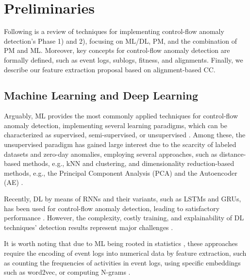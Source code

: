 \section{Preliminaries}
\label{sec:background}

Following is a review of techniques for implementing control-flow anomaly detection's Phase 1) and 2), focusing on ML/DL, PM, and the combination of PM and ML. Moreover, key concepts for control-flow anomaly detection are formally defined, such as event logs, sublogs, fitness, and alignments. Finally, we describe our feature extraction proposal based on alignment-based CC.

\subsection{Machine Learning and Deep Learning}
Arguably, ML provides the most commonly applied techniques for control-flow anomaly detection, implementing several learning paradigms, which can be characterized as supervised, semi-supervised, or unsupervised \cite{witten2017dmml}. Among these, the unsupervised paradigm has gained large interest due to the scarcity of labeled datasets and zero-day anomalies, employing several approaches, such as distance-based methods, e.g., kNN and clustering, and dimensionality reduction-based methods, e.g., the Principal Component Analysis (PCA) and the Autoencoder (AE) \cite{zoppi2021unsupervisedad,sakurada2014adeutoencoders}.

Recently, DL by means of RNNs and their variants, such as LSTMs and GRUs, has been used for control-flow anomaly detection, leading to satisfactory performance \cite{nolle2022binet, lahann2022lstmadpi}. However, the complexity, costly training, and explainability of DL techniques' detection results represent major challenges \cite{wang2022dlspatiotemporaldm,chen2022efficientrnntraining}. 

It is worth noting that due to ML being rooted in statistics \cite{witten2017dmml}, these approaches require the encoding of event logs into numerical data by feature extraction, such as counting the frequencies of activities in event logs, using specific embeddings such as word2vec, or computing N-grams \cite{ko2023adsystematicreview}.

